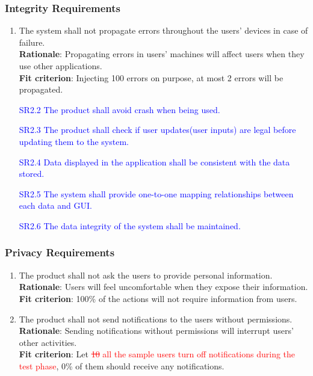 \documentclass{article}
\begin{document}
\subsubsection{Integrity Requirements}
\begin{enumerate}[SR2.1]
    \item The system shall not propagate errors throughout the users' devices in case of failure.\\
    \textbf{Rationale}: Propagating errors in users' machines will affect
    users when they use other applications.\\
    \textbf{Fit criterion}: Injecting 100 errors on purpose, at most 2 errors
    will be propagated.
     \item[\textcolor{blue}{SR2.2}] \textcolor{blue}{The product shall avoid crash when being used.}
    \item[\textcolor{blue}{SR2.3}] \textcolor{blue}{The product shall check if user
    updates(user inputs) are legal before updating them to the system.}
    \item[\textcolor{blue}{SR2.4}] \textcolor{blue}{Data displayed in the application shall be
     consistent with the data stored.}
    \item[\textcolor{blue}{SR2.5}] \textcolor{blue}{The system shall provide one-to-one mapping
     relationships between each data and GUI.}
    \item[\textcolor{blue}{SR2.6}] \textcolor{blue}{The data integrity of the system shall be
     maintained.}
\end{enumerate}
\subsubsection{Privacy Requirements}
\begin{enumerate}[SR3.1]
    \item The product shall not ask the users to provide personal information.\\
    \textbf{Rationale}: Users will feel uncomfortable when they expose their information.\\
    \textbf{Fit criterion}: 100\% of the actions will not require information from users.
    \item The product shall not send notifications to the users 
    without permissions.\\
    \textbf{Rationale}: Sending notifications without permissions will
    interrupt users' other activities.\\
    \textbf{Fit criterion}: Let \textcolor{red}{\st{10} all the sample users turn off notifications
    during the test phase}, 0\% of them should receive any notifications.\\
\end{enumerate}
\end{document}
